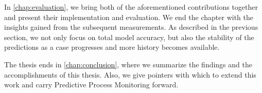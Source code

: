 In \autoref{chap:evaluation}, we bring both of the aforementioned contributions together and present their implementation and evaluation. We end the chapter with the insights gained from the subsequent measurements. As described in the previous section, we not only focus on total model accuracy, but also the stability of the predictions as a case progresses and more history becomes available.

The thesis ends in \autoref{chap:conclusion}, where we summarize the findings and the accomplishments of this thesis. Also, we give pointers with which to extend this work and carry Predictive Process Monitoring forward.
